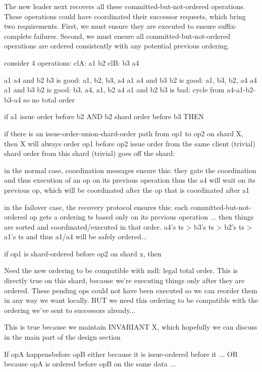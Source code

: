 The new leader next recovers all these committed-but-not-ordered operations.
These operations could have coordinated their successor requests, which bring two requirements.
First, we must ensure they are executed to ensure suffix-complete failures.
%
Second, we must ensure all committed-but-not-ordered operations are ordered consistently with any potential previous ordering.
%


consider 4 operations:
clA: a1 b2
clB: b3 a4


a1 a4 and b2 b3 is good: a1, b2, b3, a4
a1 a4 and b3 b2 is good: a1, b3, b2, a4
a4 a1 and b3 b2 is good: b3, a4, a1, b2
a4 a1 and b2 b3 is bad: cycle from a4-a1-b2-b3-a4 so no total order

if a1 issue order before b2 AND b2 shard order before b3 THEN



if there is an issue-order-union-shard-order path from op1 to op2 on shard X, then X will always order op1 before op2
issue order from the same client (trivial)
shard order from this shard (trivial)
goes off the shard:

in the normal case, coordination messages ensure this:
they gate the coordination and thus execution of an op on its previous operation
thus the a4 will wait on its previous op, which will be coordinated after the op that is coordinated after a1

in the failover case, the recovery protocol ensures this:
each committed-but-not-ordered op gets a ordering ts based only on its previous operation ...
then things are sorted and coordinated/executed in that order.
a4's ts > b3's ts > b2's ts > a1's ts and thus a1/a4 will be safely ordered...








if op1 is shard-ordered before op2 on shard x, then




Need the new ordering to be compatible with mdl: legal total order.
This is directly true on this shard, because we're executing things only after they are ordered.
These pending ops could not have been executed so we can reorder them in any way we want locally.
BUT we need this ordering to be compatible with the ordering we've sent to successors already...

This is true because we maintain INVARIANT X, which hopefully we can discuss in the main part of the design section

If opA happensbefore opB
either because it is issue-ordered before it ...
OR
because opA is ordered before opB on the same data ...


